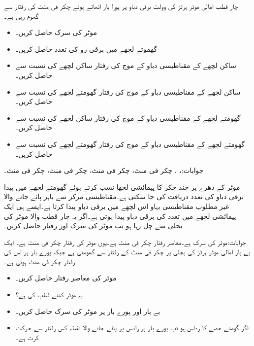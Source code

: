 چار قطب امالی موٹر  ہرٹز کی  وولٹ برقی دباو پر پورا بار اٹھاتے ہوئے  چکر فی منٹ کی رفتار سے گھوم رہی ہے۔
\begin{itemize}
\item
موٹر کی سرک  حاصل کریں۔
\item
گھموتے لچھے میں برقی رو کی تعدد حاصل کریں۔
\item
ساکن لچھے کے مقناطیسی دباو کے موج کی رفتار ساکن لچھے کی نسبت سے حاصل کریں۔
\item
ساکن لچھے کے مقناطیسی دباو کے موج کی رفتار گھومتے لچھے کی نسبت سے حاصل کریں۔
\item
گھومتے لچھے کے مقناطیسی دباو کے موج کی رفتار ساکن لچھے کی نسبت سے حاصل کریں۔
\item
گھومتے لچھے کے مقناطیسی دباو کے موج کی رفتار گھومتے لچھے کی نسبت سے حاصل کریں۔
\end{itemize} 

جوابات:، ،  چکر فی منٹ،  چکر فی منٹ،  چکر فی منٹ،  چکر فی منٹ۔

موٹر کے دھرے پر چند چکر کا پیمائشی لچھا نسب کرتے ہوئے گھومتے لچھے میں پیدا برقی دباو  کی تعدد دریافت کی جا سکتی ہے۔مقناطیسی مرکز سے باہر پائے جانے والا غیر مطلوب مقناطیسی بہاو اس لچھے میں برقی دباو پیدا کرتا ہے۔ایسے ہی ایک پیمائشی لچھے میں  تعدد  کی برقی دباو پیدا ہوتی ہے۔اگر یہ چار قطب والا موٹر  کی بجلی سے چل رہا ہو تب موٹر کی سرک اور رفتار حاصل کریں۔

 جوابات:موٹر کی سرک  ہے۔معاصر رفتار  چکر فی منٹ ہے۔یوں موٹر کی رفتار   چکر فی منٹ ہے۔
ایک بے بار امالی موٹر  ہرٹز کی بجلی پر  چکر فی منٹ کے رفتار سے گھومتی ہے جبکہ پورے بار پر اس کی رفتار   چکر فی منٹ ہوتی ہے۔
\begin{itemize}
\item
موٹر کی معاصر رفتار حاصل کریں۔ 
 \item
یہ موٹر کتنے قطب کی ہے؟
\item
بے بار اور پورے بار پر موٹر کی سرک حاصل کریں۔
\item
اگر گومتے حصے کا رداس  ہو تب پورے بار پر رادس پر پائے جانے والا نقطہ کس رفتار سے حرکت کرت ہے۔ 
\end{itemize}

